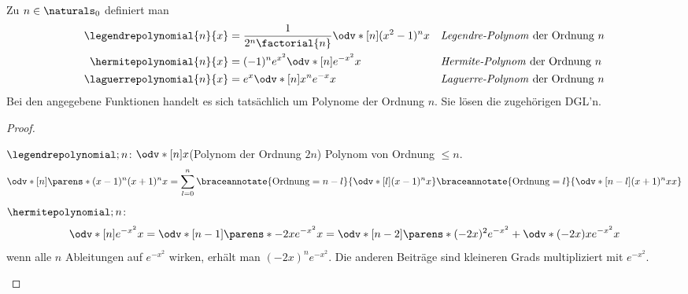 \begin{lemma}
  Zu \( n\in \naturals_0 \) definiert man
  \begin{align*}
    \legendrepolynomial{n}{x}&=\frac{1}{2^n \factorial{n}}\odv*[n]{(x^2-1)^n}{x}&&\text{\define{Legendre-Polynom} der Ordnung \( n \)}\\
    \hermitepolynomial{n}{x}&=(-1)^n e^{x^2}\odv*[n]{e^{-x^2}}{x}&&\text{\define{Hermite-Polynom} der Ordnung \( n \)}\\
    \laguerrepolynomial{n}{x}&=e^x\odv*[n]{x^n e^{-x}}{x}&&\text{\define{Laguerre-Polynom}   der Ordnung \( n \)}
  \end{align*}
  Bei den angegebene Funktionen handelt es sich tatsächlich um Polynome der Ordnung \( n \). Sie lösen die zugehörigen DGL'n.
\end{lemma}
\begin{proof}
  \begin{proofdescription}
    \item[\ordinalnum{1} \Beh] \( \legendrepolynomial;{n} \): \( \odv*[n]{}{x} \)(Polynom der Ordnung \( 2n \)) \teq Polynom von Ordnung \( \leq n \).
    \begin{equation*}
      \odv*[n]{\parens*{(x-1)^n(x+1)^n}}{x}=\sum_{l=0}^{n}\braceannotate{\text{Ordnung}=n-l}{\odv*[l]{(x-1)^n}{x}}\braceannotate{\text{Ordnung}=l}{\odv*[n-l]{(x+1)^n{x}}{x}}
    \end{equation*}
    \( \hermitepolynomial;{n} \):
    \begin{equation*}
      \odv*[n]{e^{-x^2}}{x}=\odv*[n-1]{\parens*{-2xe^{-x^2}}}{x}=\odv*[n-2]{\parens*{(-2x)^2e^{-x^2}+\odv*{(-2x)}{x}e^{-x^2}}}{x}
    \end{equation*}
    \timplies wenn alle \( n \) Ableitungen auf \( e^{-x^2} \) wirken, erhält man \( (-2x)^n e^{-x^2} \). Die anderen Beiträge sind kleineren Grads multipliziert mit \( e^{-x^2} \).


\end{proofdescription}
\end{proof}
